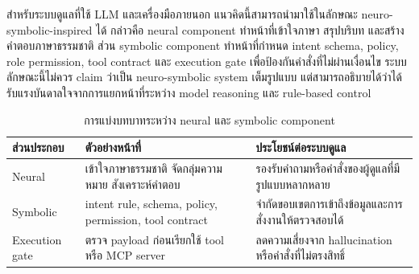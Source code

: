 สำหรับระบบดูแลที่ใช้ LLM และเครื่องมือภายนอก แนวคิดนี้สามารถนำมาใช้ในลักษณะ neuro-symbolic-inspired ได้ กล่าวคือ neural component ทำหน้าที่เข้าใจภาษา สรุปบริบท และสร้างคำตอบภาษาธรรมชาติ ส่วน symbolic component ทำหน้าที่กำหนด intent schema, policy, role permission, tool contract และ execution gate เพื่อป้องกันคำสั่งที่ไม่ผ่านเงื่อนไข ระบบลักษณะนี้ไม่ควร claim ว่าเป็น neuro-symbolic system เต็มรูปแบบ แต่สามารถอธิบายได้ว่าได้รับแรงบันดาลใจจากการแยกหน้าที่ระหว่าง model reasoning และ rule-based control

\begin{table}[htbp]
    \centering
    \caption{การแบ่งบทบาทระหว่าง neural และ symbolic component}
    \label{tab:ch2_neuro_symbolic_roles}
    \small
    \begin{tabular}{>{\raggedright\arraybackslash}p{}
                    >{\raggedright\arraybackslash}p{}
                    >{\raggedright\arraybackslash}p{}}
        \toprule
        ส่วนประกอบ & ตัวอย่างหน้าที่ & ประโยชน์ต่อระบบดูแล \\ \midrule
        Neural & เข้าใจภาษาธรรมชาติ จัดกลุ่มความหมาย สังเคราะห์คำตอบ & รองรับคำถามหรือคำสั่งของผู้ดูแลที่มีรูปแบบหลากหลาย \\ \midrule
        Symbolic & intent rule, schema, policy, permission, tool contract & จำกัดขอบเขตการเข้าถึงข้อมูลและการสั่งงานให้ตรวจสอบได้ \\ \midrule
        Execution gate & ตรวจ payload ก่อนเรียกใช้ tool หรือ MCP server & ลดความเสี่ยงจาก hallucination หรือคำสั่งที่ไม่ตรงสิทธิ์ \\ \bottomrule
    \end{tabular}
\end{table}

